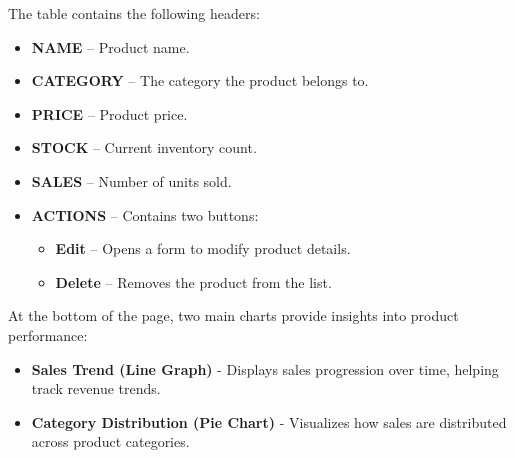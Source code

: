 \documentclass[11pt,a4paper]{article}
\begin{document}
	The table contains the following headers:
	\begin{itemize}
		\item \textbf{NAME} – Product name.
		\item \textbf{CATEGORY} – The category the product belongs to.
		\item \textbf{PRICE} – Product price.
		\item \textbf{STOCK} – Current inventory count.
		\item \textbf{SALES} – Number of units sold.
		\item \textbf{ACTIONS} – Contains two buttons:
		\begin{itemize}
			\item \textbf{Edit} – Opens a form to modify product details.
			\item \textbf{Delete} – Removes the product from the list.
		\end{itemize}
	\end{itemize}
	At the bottom of the page, two main charts provide insights into product performance:
	\begin{itemize}
		\item \textbf{Sales Trend (Line Graph)} - Displays sales progression over time, helping track revenue trends.
		\item \textbf{Category Distribution (Pie Chart)} - Visualizes how sales are distributed across product categories.
	\end{itemize}
	
	
\end{document}
